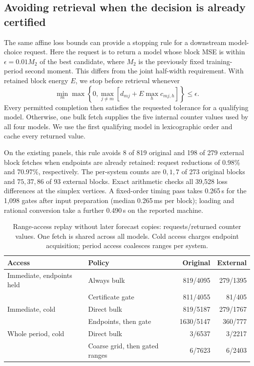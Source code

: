 \subsection{Avoiding retrieval when the decision is already certified}
\label{sec:retrieval-gate}
The same affine loss bounds can provide a stopping rule for a downstream
model-choice request. Here the request is to return a model whose block MSE is
within $\epsilon=0.01M_2$ of the best candidate, where $M_2$ is the previously
fixed training-period second moment. This differs from the joint half-width
requirement. With retained block energy $E$, we stop before retrieval whenever
\[
 \min_m\max\left\{0,\max_{j\ne m}
 \left[d_{mj}+E\max_h c_{mj,h}\right]\right\}\leq\epsilon.
\]
Every permitted completion then satisfies the requested tolerance for a
qualifying model. Otherwise, one bulk fetch supplies the five internal counter
values used by all four models. We use the first qualifying model in
lexicographic order and cache every returned value.

On the existing panels, this rule avoids 8 of 819 original and 198 of 279
external block fetches when endpoints are already retained: request reductions
of 0.98\% and 70.97\%, respectively. The per-system counts are $0,1,7$ of
273 original blocks and $75,37,86$ of 93 external blocks. Exact arithmetic
checks all 39,528 loss differences at the simplex vertices. A fixed-order
timing pass takes 0.265\,s for the 1,098 gates after input preparation
(median 0.265\,ms per block); loading and rational conversion take a further
0.490\,s on the reported machine.

\begin{table}[htbp]
\centering\small
\caption{Range-access replay without later forecast copies:
requests/returned counter values. One fetch is
shared across all models. Cold access charges endpoint acquisition; period
access coalesces ranges per system.}
\label{tab:retrieval-gate-cost}
\begin{tabular}{llrr}
\toprule
Access & Policy & Original & External\\
\midrule
Immediate, endpoints held & Always bulk & 819/4095 & 279/1395\\
                         & Certificate gate & 811/4055 & 81/405\\
Immediate, cold          & Direct bulk & 819/5187 & 279/1767\\
                         & Endpoints, then gate & 1630/5147 & 360/777\\
Whole period, cold       & Direct bulk & 3/6537 & 3/2217\\
                         & Coarse grid, then gated ranges & 6/7623 & 6/2403\\
\bottomrule
\end{tabular}
\end{table}

